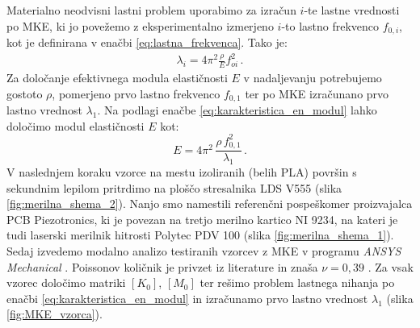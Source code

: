             Materialno neodvisni lastni problem uporabimo za izračun $i$-te lastne vrednosti po MKE, ki jo povežemo z eksperimentalno izmerjeno $i$-to lastno frekvenco $f_{0,i}$, kot je definirana v enačbi \eqref{eq:lastna_frekvenca}.
            Tako je:
            \begin{align}\label{eq:karakteristica_en_modul}
                \lambda_i = 4 \pi^2 \frac{\rho}{E} f_{oi}^2 \,.
            \end{align}
            Za določanje efektivnega modula elastičnosti $E$ v nadaljevanju potrebujemo gostoto $\rho$, pomerjeno prvo lastno frekvenco $f_{0,1}$ ter po MKE izračunano prvo lastno vrednost $\lambda_1$. Na podlagi enačbe \eqref{eq:karakteristica_en_modul} lahko določimo modul elastičnosti $E$ kot:
            \begin{equation}\label{eq:modul}
                E=4 \pi^{2} \, \frac{\rho \, f_{0,1}^{2}}{\lambda_{1}} \, .
            \end{equation}
            V naslednjem koraku vzorce na mestu izoliranih (belih PLA) površin s sekundnim lepilom pritrdimo na ploščo stresalnika LDS V555 (slika \ref{fig:merilna_shema_2}). Nanjo smo namestili referenčni pospeškomer proizvajalca PCB Piezotronics, ki je povezan na tretjo merilno kartico NI 9234, na kateri je tudi laserski merilnik hitrosti Polytec PDV 100 (slika \ref{fig:merilna_shema_1}). Sedaj izvedemo modalno analizo testiranih vzorcev z MKE v programu \textit{ANSYS Mechanical} \cite{thompson2017ansys}. Poissonov količnik je privzet iz literature in znaša $\nu = 0,39$ \cite{Ferreira_2017}. Za vsak vzorec določimo matriki $[K_0]$, $[M_0]$ ter rešimo problem lastnega nihanja po enačbi \eqref{eq:karakteristica_en_modul} in izračunamo prvo lastno vrednost $\lambda_1$ (slika \ref{fig:MKE_vzorca}).
